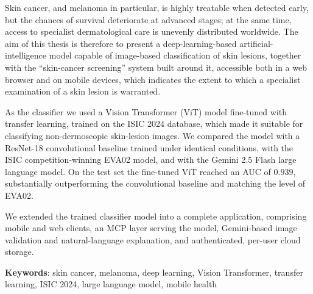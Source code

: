 Skin cancer, and melanoma in particular, is highly treatable when detected
early, but the chances of survival deteriorate at advanced stages; at the same
time, access to specialist dermatological care is unevenly distributed worldwide.
The aim of this thesis is therefore to present a deep-learning-based
artificial-intelligence model capable of image-based classification of skin
lesions, together with the ``skin-cancer screening'' system built around it,
accessible both in a web browser and on mobile devices, which indicates the extent
to which a specialist examination of a skin lesion is warranted.

As the classifier we used a Vision Transformer (ViT) model fine-tuned with
transfer learning, trained on the ISIC 2024 database, which made it suitable for
classifying non-dermoscopic skin-lesion images. We compared the model with a
ResNet-18 convolutional baseline trained under identical conditions, with the
ISIC competition-winning EVA02 model, and with the Gemini 2.5 Flash large
language model. On the test set the fine-tuned ViT reached an AUC of $0.939$,
substantially outperforming the convolutional baseline and matching the level of
EVA02.

We extended the trained classifier model into a complete application, comprising
mobile and web clients, an MCP layer serving the model, Gemini-based image
validation and natural-language explanation, and authenticated, per-user cloud
storage.

\textbf{Keywords}: skin cancer, melanoma, deep learning, Vision Transformer,
transfer learning, ISIC 2024, large language model, mobile health
